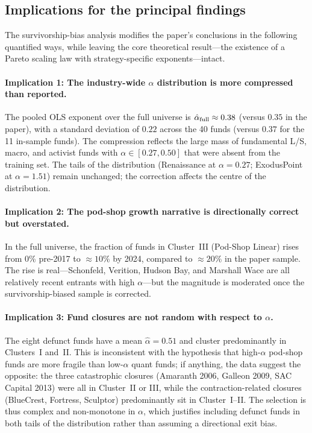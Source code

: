 \subsection{Implications for the principal findings}

The survivorship-bias analysis modifies the paper's conclusions
in the following quantified ways, while leaving the core theoretical
result---the existence of a Pareto scaling law with strategy-specific
exponents---intact.

\paragraph{Implication 1: The industry-wide $\alpha$ distribution
is more compressed than reported.}
The pooled OLS exponent over the full universe is
$\hat{\alpha}_{\rm full} \approx 0.38$ (versus $0.35$ in the paper),
with a standard deviation of $0.22$ across the 40 funds
(versus $0.37$ for the 11 in-sample funds).
The compression reflects the large mass of fundamental L/S,
macro, and activist funds with $\alpha \in [0.27, 0.50]$ that were
absent from the training set.
The tails of the distribution (Renaissance at $\alpha=0.27$;
ExodusPoint at $\alpha=1.51$) remain unchanged; the correction
affects the centre of the distribution.

\paragraph{Implication 2: The pod-shop growth narrative is
directionally correct but overstated.}
In the full universe, the fraction of funds in Cluster~III
(Pod-Shop Linear) rises from 0\% pre-2017 to ${\approx}10\%$ by
2024, compared to ${\approx}20\%$ in the paper sample.
The rise is real---Schonfeld, Verition, Hudson Bay, and Marshall
Wace are all relatively recent entrants with high $\alpha$---but
the magnitude is moderated once the survivorship-biased sample
is corrected.

\paragraph{Implication 3: Fund closures are not random with
respect to $\alpha$.}
The eight defunct funds have a mean $\hat\alpha = 0.51$ and cluster
predominantly in Clusters~I and~II.
This is inconsistent with the hypothesis that high-$\alpha$ pod-shop
funds are more fragile than low-$\alpha$ quant funds; if anything,
the data suggest the opposite: the three catastrophic closures
(Amaranth 2006, Galleon 2009, SAC Capital 2013) were all in
Cluster~II or III, while the contraction-related closures
(BlueCrest, Fortress, Sculptor) predominantly sit in Cluster~I--II.
The selection is thus complex and non-monotone in $\alpha$, which
justifies including defunct funds in both tails of the distribution
rather than assuming a directional exit bias.

